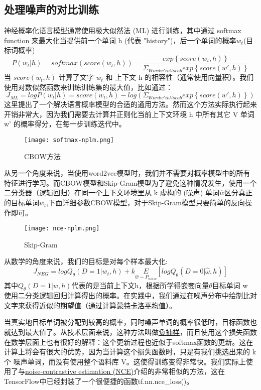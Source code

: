 \subsection{处理噪声的对比训练}
神经概率化语言模型通常使用极大似然法 (ML) 进行训练，其中通过 softmax function 来最大化当提供前一个单词 h (代表 "history")，后一个单词的概率$w_t$(目标词概率)
\begin{equation*}
P(w_t|h)=softmax(score(w_t,h))=\frac{exp\left\{score(w_t,h)\right\}}{\Sigma_{Word w' in Vocab}exp\left\{score(w',h)\right\}}
\end{equation*}
当 $score(w_t,h)$ 计算了文字 $w_t$ 和 上下文 h 的相容性（通常使用向量积）。我们使用对数似然函数来训练训练集的最大值，比如通过：
\begin{equation*}
J_{ML} = logP(w_t|h)=score(w_t,h)-log(\Sigma_{Word w' in Vocab}exp\left\{score(w',h)\right\})
\end{equation*}
这里提出了一个解决语言概率模型的合适的通用方法。然而这个方法实际执行起来开销非常大，因为我们需要去计算并正则化当前上下文环境 h 中所有其它 V 单词 w' 的概率得分，在每一步训练迭代中。
\begin{figure}[H]
\texttt{[image: softmax-nplm.png]}
\caption{CBOW方法}
\end{figure}
从另一个角度来说，当使用word2vec模型时，我们并不需要对概率模型中的所有特征进行学习。而CBOW模型和Skip-Gram模型为了避免这种情况发生，使用一个二分类器（逻辑回归）在同一个上下文环境里从 k 虚构的 (噪声) 单词$\hat{w}$区分真正的目标单词$w_t$,下面详细参数CBOW模型，对于Skip-Gram模型只要简单的反向操作即可。
\begin{center}
\begin{figure}[H]
\texttt{[image: nce-nplm.png]}
\caption{Skip-Gram}
\end{figure}
\end{center}
从数学的角度来说，我们的目标是对每个样本最大化:
\begin{equation*}
J_{NEG}=logQ_{\theta}(D=1|w_t,h)+k\underset{\hat{w}\sim P_{noise}}{E}[logQ_{\theta}(D=0|\hat{\omega},h)]
\end{equation*}
其中$Q_{\theta}(D=1|w,h)$代表的是当前上下文h，根据所学得嵌套向量$\theta$目标单词 w 使用二分类逻辑回归计算得出的概率。在实践中，我们通过在噪声分布中绘制比对文字来获得近似的期望值（通过计算\href{https://en.wikipedia.org/wiki/Monte_Carlo_integration}{蒙特卡洛平均值}）。

当真实地目标单词被分配到较高的概率，同时噪声单词的概率很低时，目标函数也就达到最大值了。从技术层面来说，这种方法叫做\href{http://papers.nips.cc/paper/5021-distributed-representations-of-words-and-phrases-and-their-compositionality.pdf}{负抽样}，而且使用这个损失函数在数学层面上也有很好的解释：这个更新过程也近似于softmax函数的更新。这在计算上将会有很大的优势，因为当计算这个损失函数时，只是有我们挑选出来的 k 个 噪声单词，而没有使用整个语料库 V。这使得训练变得非常快。我们实际上使用了与\href{http://papers.nips.cc/paper/5165-learning-word-embeddings-efficiently-with-noise-contrastive-estimation.pdf}{noise-contrastive estimation (NCE)}介绍的非常相似的方法，这在TensorFlow中已经封装了一个很便捷的函数tf.nn.nce\_loss()。

